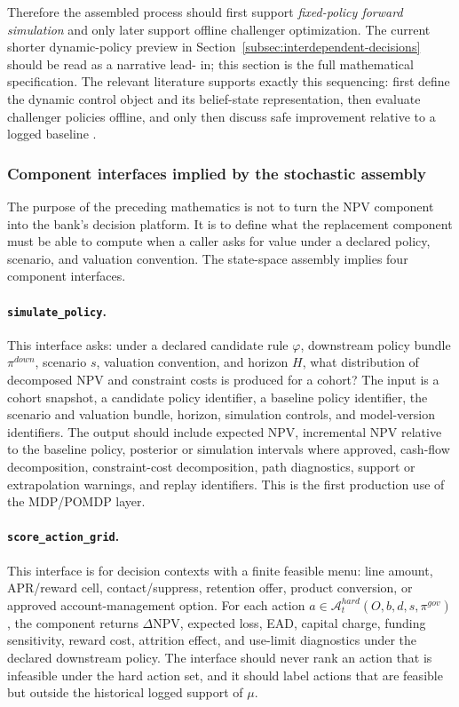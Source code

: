 \documentclass[11pt]{article}
\newcommand{\NPV}{\mathrm{NPV}}
\newcommand{\1}{\mathbf{1}}
\newcommand{\code}[1]{\nolinkurl{#1}}
\begin{document}
Therefore the assembled process should first support
\emph{fixed-policy forward simulation} and only later support offline challenger
optimization. The current shorter dynamic-policy preview in
Section~\ref{subsec:interdependent-decisions} should be read as a narrative lead-
in; this section is the full mathematical specification. The relevant literature
supports exactly this sequencing: first define the dynamic control object and
its belief-state representation, then evaluate challenger policies offline, and
only then discuss safe improvement relative to a logged baseline
\citep{puterman1994mdp,murphy2003dynamic,jiangli2016dr,
huwager2021pomdpope,laroche2019spibb,khraishiokhrati2022offlinecredit}.

\subsubsection{Component interfaces implied by the stochastic assembly}
\label{subsec:state-space-component-interfaces}

The purpose of the preceding mathematics is not to turn the NPV component into
the bank's decision platform. It is to define what the replacement component must
be able to compute when a caller asks for value under a declared policy,
scenario, and valuation convention. The state-space assembly implies four
component interfaces.

\paragraph{\code{simulate_policy}.}
This interface asks: under a declared candidate rule $\varphi$, downstream
policy bundle $\pi^{down}$, scenario $s$, valuation convention, and horizon $H$,
what distribution of decomposed NPV and constraint costs is produced for a
cohort? The input is a cohort snapshot, a candidate policy identifier, a baseline
policy identifier, the scenario and valuation bundle, horizon, simulation
controls, and model-version identifiers. The output should include expected NPV,
incremental NPV relative to the baseline policy, posterior or simulation
intervals where approved, cash-flow decomposition, constraint-cost
decomposition, path diagnostics, support or extrapolation warnings, and replay
identifiers. This is the first production use of the MDP/POMDP layer.

\paragraph{\code{score_action_grid}.}
This interface is for decision contexts with a finite feasible menu: line amount,
APR/reward cell, contact/suppress, retention offer, product conversion, or
approved account-management option. For each action
$a\in\mathcal{A}^{hard}_{t}(O,b,d,s,\pi^{gov})$, the component returns
$\Delta \NPV$, expected loss, EAD, capital charge, funding sensitivity, reward
cost, attrition effect, and use-limit diagnostics under the declared downstream
policy. The interface should never rank an action that is infeasible under the
hard action set, and it should label actions that are feasible but outside the
historical logged support of $\mu$.
\end{document}
